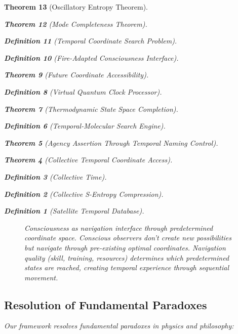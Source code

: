 \documentclass[12pt,a4paper]{article}
\newtheorem{theorem}{Theorem}[section]
\newtheorem{definition}[theorem]{Definition}
\begin{document}
\begin{theorem}[Oscillatory Entropy Theorem]
\begin{theorem}[Mode Completeness Theorem]
\begin{enumerate}
\begin{definition}[Temporal Coordinate Search Problem]
\begin{algorithm}
\begin{definition}[Fire-Adapted Consciousness Interface]
\begin{theorem}[Future Coordinate Accessibility]
\begin{definition}[Virtual Quantum Clock Processor]
\begin{itemize}
\begin{itemize}
\begin{theorem}[Thermodynamic State Space Completion]
\begin{definition}[Temporal-Molecular Search Engine]
\begin{theorem}[Agency Assertion Through Temporal Naming Control]
\begin{remark}
\begin{theorem}[Collective Temporal Coordinate Access]
\begin{definition}[Collective Time]
\begin{definition}[Collective S-Entropy Compression]
\begin{definition}[Satellite Temporal Database]
\begin{algorithm}
\begin{table}[h]
{{\begin{figure}[h]
\caption{Consciousness as navigation interface through predetermined coordinate space. Conscious observers don't create new possibilities but navigate through pre-existing optimal coordinates. Navigation quality (skill, training, resources) determines which predetermined states are reached, creating temporal experience through sequential movement.}
\label{fig:consciousness_navigation}
\end{figure}

\subsection{Resolution of Fundamental Paradoxes}

Our framework resolves fundamental paradoxes in physics and philosophy:

}}
\end{table}
\end{algorithm}
\end{definition}
\end{definition}
\end{definition}
\end{theorem}
\end{remark}
\end{theorem}
\end{definition}
\end{theorem}
\end{itemize}
\end{itemize}
\end{definition}
\end{theorem}
\end{definition}
\end{algorithm}
\end{definition}
\end{enumerate}
\end{theorem}
\end{theorem}
\end{document}
